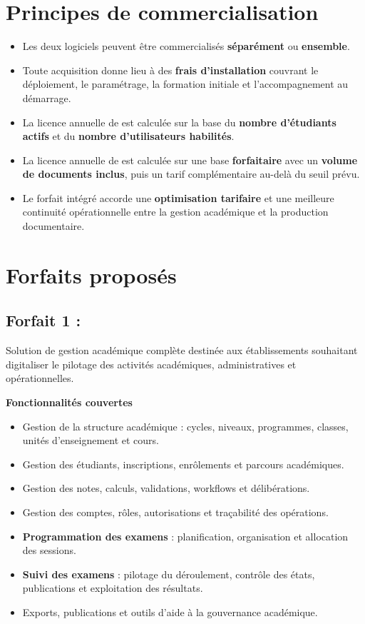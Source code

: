 \documentclass[12pt,a4paper]{article}
\newcommand{\FeatureListStart}{\begin{itemize}[leftmargin=1.2cm,itemsep=0.3em]}
\newcommand{\FeatureListEnd}{\end{itemize}}
\begin{document}
\section{Principes de commercialisation}

\FeatureListStart
    \item Les deux logiciels peuvent être commercialisés \textbf{séparément} ou \textbf{ensemble}.
    \item Toute acquisition donne lieu à des \textbf{frais d'installation} couvrant le déploiement, le paramétrage, la formation initiale et l'accompagnement au démarrage.
    \item La licence annuelle de \AcademicSoftwareName{} est calculée sur la base du \textbf{nombre d'étudiants actifs} et du \textbf{nombre d'utilisateurs habilités}.
    \item La licence annuelle de \DocumentSoftwareName{} est calculée sur une base \textbf{forfaitaire} avec un \textbf{volume de documents inclus}, puis un tarif complémentaire au-delà du seuil prévu.
    \item Le forfait intégré accorde une \textbf{optimisation tarifaire} et une meilleure continuité opérationnelle entre la gestion académique et la production documentaire.
\FeatureListEnd

\section{Forfaits proposés}

\subsection{Forfait 1 : \AcademicSoftwareName}

\begin{tcolorbox}[colback=SoftBlue,colframe=PrimaryBlue,title=Positionnement]
Solution de gestion académique complète destinée aux établissements souhaitant digitaliser le pilotage des activités académiques, administratives et opérationnelles.
\end{tcolorbox}

\textbf{Fonctionnalités couvertes}
\FeatureListStart
    \item Gestion de la structure académique : cycles, niveaux, programmes, classes, unités d'enseignement et cours.
    \item Gestion des étudiants, inscriptions, enrôlements et parcours académiques.
    \item Gestion des notes, calculs, validations, workflows et délibérations.
    \item Gestion des comptes, rôles, autorisations et traçabilité des opérations.
    \item \textbf{Programmation des examens} : planification, organisation et allocation des sessions.
    \item \textbf{Suivi des examens} : pilotage du déroulement, contrôle des états, publications et exploitation des résultats.
    \item Exports, publications et outils d'aide à la gouvernance académique.
\FeatureListEnd
\end{document}
